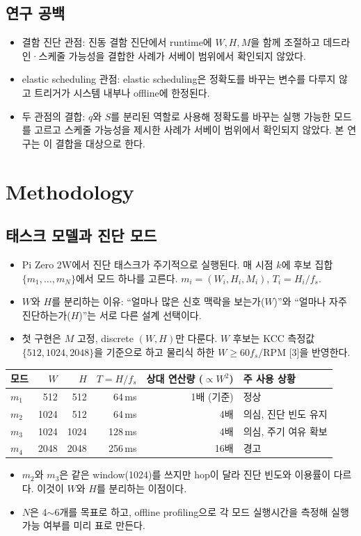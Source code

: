 \documentclass[10pt]{article}
\begin{document}
\subsection{연구 공백}
\begin{itemize}
\item 결함 진단 관점: 진동 결함 진단에서 runtime에 $W,H,M$을 함께 조절하고 데드라인·스케줄 가능성을 결합한 사례가 서베이 범위에서 확인되지 않았다.
\item elastic scheduling 관점: elastic scheduling은 정확도를 바꾸는 변수를 다루지 않고 트리거가 시스템 내부나 offline에 한정된다.
\item 두 관점의 결합: $q$와 $S$를 분리된 역할로 사용해 정확도를 바꾸는 실행 가능한 모드를 고르고 스케줄 가능성을 제시한 사례가 서베이 범위에서 확인되지 않았다. 본 연구는 이 결합을 대상으로 한다.
\end{itemize}

\section{Methodology}
\subsection{태스크 모델과 진단 모드}
\begin{itemize}
\item Pi Zero 2W에서 진단 태스크가 주기적으로 실행된다. 매 시점 $k$에 후보 집합 $\{m_1,\dots,m_N\}$에서 모드 하나를 고른다. $m_i=(W_i,H_i,M_i)$, $T_i=H_i/f_s$.
\item $W$와 $H$를 분리하는 이유: ``얼마나 많은 신호 맥락을 보는가($W$)''와 ``얼마나 자주 진단하는가($H$)''는 서로 다른 설계 선택이다.
\item 첫 구현은 $M$ 고정, discrete $(W,H)$만 다룬다. $W$ 후보는 KCC 측정값 $\{512,1024,2048\}$을 기준으로 하고 물리식 하한 $W\ge 60 f_s/\mathrm{RPM}$ [3]을 반영한다.
\end{itemize}
\begin{center}\footnotesize
\begin{tabular}{@{}lrrrrl@{}}
\toprule
모드 & $W$ & $H$ & $T=H/f_s$ & 상대 연산량 ($\propto W^2$) & 주 사용 상황 \\ \midrule
$m_1$ & 512 & 512 & 64\,ms & 1배 (기준) & 정상 \\
$m_2$ & 1024 & 512 & 64\,ms & 4배 & 의심, 진단 빈도 유지 \\
$m_3$ & 1024 & 1024 & 128\,ms & 4배 & 의심, 주기 여유 확보 \\
$m_4$ & 2048 & 2048 & 256\,ms & 16배 & 경고 \\
\bottomrule
\end{tabular}
\end{center}
\begin{itemize}
\item $m_2$와 $m_3$은 같은 window(1024)를 쓰지만 hop이 달라 진단 빈도와 이용률이 다르다. 이것이 $W$와 $H$를 분리하는 이점이다.
\item $N$은 4$\sim$6개를 목표로 하고, offline profiling으로 각 모드 실행시간을 측정해 실행 가능 여부를 미리 표로 만든다.
\end{itemize}
\end{document}
